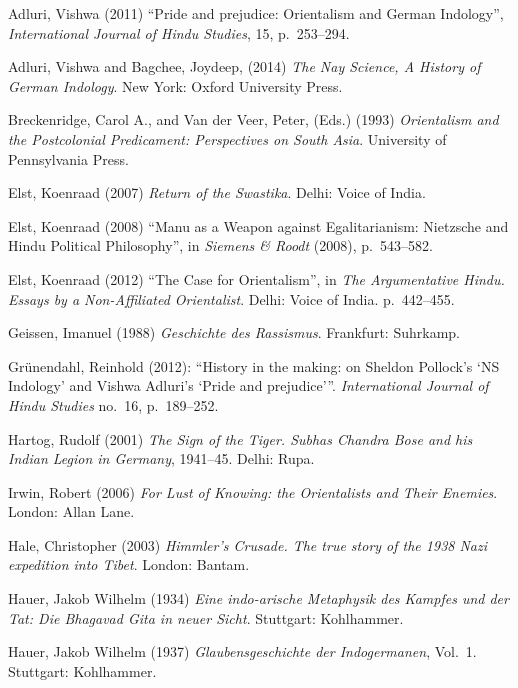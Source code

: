 \begin{thebibliography}{99}
\itemsep=2pt
Adluri, Vishwa (2011) “Pride and prejudice: Orientalism and German Indology”, {\sl International Journal of Hindu Studies}, 15, p.~253--294.

Adluri, Vishwa and Bagchee, Joydeep, (2014) {\sl The Nay Science, A History of German Indology}. New York: Oxford University Press.

Breckenridge, Carol A., and Van der Veer, Peter, (Eds.) (1993) {\sl Orientalism and the Postcolonial Predicament: Perspectives on South Asia}. University of Pennsylvania Press.

Elst, Koenraad (2007) {\sl Return of the Swastika}.  Delhi: Voice of India.

Elst, Koenraad (2008) “Manu as a Weapon against Egalitarianism: Nietzsche and Hindu Political Philosophy”, in {\sl Siemens \& Roodt} (2008), p.~543--582.

Elst, Koenraad (2012) “The Case for Orientalism”, in {\sl The Argumentative Hindu. Essays by a Non-Affiliated Orientalist}. Delhi: Voice of India. p.~442--455.

Geissen, Imanuel (1988) {\sl Geschichte des Rassismus}. Frankfurt: Suhrkamp.

Grünendahl, Reinhold (2012): “History in the making: on Sheldon Pollock’s ‘NS Indology’ and Vishwa Adluri’s ‘Pride and prejudice’”. 
{\sl International Journal of Hindu Studies} no.~16, p.~189--252.

Hartog, Rudolf (2001) {\sl The Sign of the Tiger. Subhas Chandra Bose and his Indian Legion in Germany}, 1941--45. Delhi: Rupa.

Irwin, Robert (2006) {\sl For Lust of Knowing: the Orientalists and Their Enemies}. London: Allan Lane.

Hale, Christopher (2003) {\sl Himmler’s Crusade. The true story of the 1938 Nazi expedition into Tibet}. London: Bantam.

Hauer, Jakob Wilhelm (1934) {\sl Eine indo-arische Metaphysik des Kampfes und der Tat: Die Bhagavad Gita in neuer Sicht}. Stuttgart: Kohlhammer.

Hauer, Jakob Wilhelm (1937) {\sl Glaubensgeschichte der Indogermanen}, Vol.~1. Stuttgart: Kohlhammer.


\end{thebibliography}
